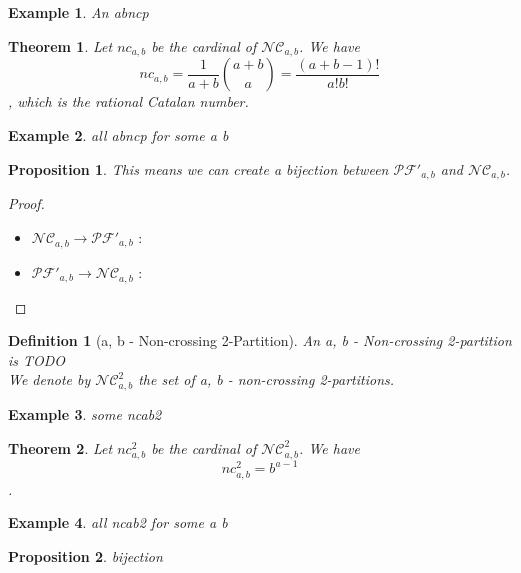 \documentclass[12pt]{report}
\newtheorem{theorem}{Theorem}
\newtheorem*{prop}{Proposition}
\newtheorem{definition}{Definition}
\newtheorem*{example}{Example}
\begin{document}
\begin{example}
    An abncp
\end{example}

\begin{theorem}
    Let $nc_{a,b}$ be the cardinal of $\mathcal{NC}_{a,b}$.
    We have $$nc_{a,b} = \frac{1}{a+b} \binom{a+b}{a} = 
    \frac{(a+b-1)!}{a!b!}$$, which is the rational Catalan
    number.
\end{theorem}

\begin{example}
    all abncp for some a b
\end{example}

\begin{prop}
    This means we can create a \emph{bijection} between
    $\mathcal{PF'}_{a,b}$ and $\mathcal{NC}_{a,b}$.
\end{prop}

\begin{proof}
    ~\\
\begin{itemize}
    \item $\mathcal{NC}_{a,b} \to \mathcal{PF'}_{a,b}$ :
    
    \item $\mathcal{PF'}_{a,b} \to \mathcal{NC}_{a,b}$ :
\end{itemize}
\end{proof}

\begin{definition}[a, b - Non-crossing 2-Partition]
    An \emph{a, b - Non-crossing 2-partition} is
    TODO\\
    We denote by $\mathcal{NC}^2_{a,b}$ the set of 
    a, b - non-crossing 2-partitions.
\end{definition}

\begin{example}
    some ncab2
\end{example}

\begin{theorem}
    Let $nc^2_{a,b}$ be the cardinal of $\mathcal{NC}^2_{a,b}$.
    We have $$nc^2_{a,b} = b^{a-1}$$.    
\end{theorem}

\begin{example}
    all ncab2 for some a b
\end{example}

\begin{prop}
    bijection
\end{prop}
\end{document}
